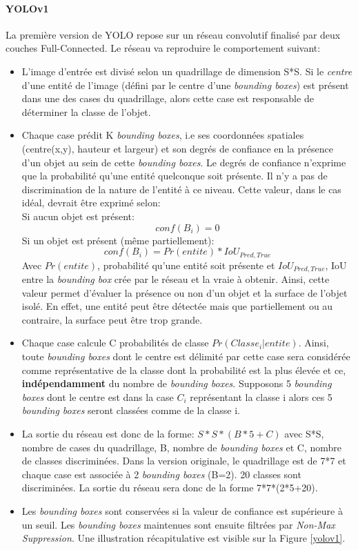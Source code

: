\paragraph{YOLOv1}
La première version de YOLO\cite{yolo_deep} repose sur un réseau convolutif finalisé par deux couches Full-Connected. Le réseau va reproduire le comportement suivant:
\begin{itemize}
    \item L'image d'entrée est divisé selon un quadrillage de dimension S*S. Si le \textit{centre} d'une entité de l'image (défini par le centre d'une \textit{bounding boxes}) est présent dans une des cases du quadrillage, alors cette case est responsable de déterminer la classe de l'objet.

    \item Chaque case prédit K \textit{bounding boxes}, i.e ses coordonnées spatiales (centre(x,y), hauteur et largeur) et son degrés de confiance en la présence d'un objet au sein de cette \textit{bounding boxes}. Le degrés de confiance n'exprime que la probabilité qu'une entité quelconque soit présente. Il n'y a pas de discrimination de la nature de l'entité à ce niveau. Cette valeur, dans le cas idéal, devrait être exprimé selon:\\

    Si aucun objet est présent:
    $$conf(B_i)=0$$
    Si un objet est présent (même partiellement):
    $$conf(B_i)=Pr(entite)*IoU_{Pred,True}$$
    Avec $Pr(entite)$, probabilité qu'une entité soit présente et $IoU_{Pred,True}$, IoU entre la \textit{bounding box} crée par le réseau et la vraie à obtenir. Ainsi, cette valeur permet d'évaluer la présence ou non d'un objet et la surface de l'objet isolé. En effet, une entité peut être détectée mais que partiellement ou au contraire, la surface peut être trop grande.

    \item Chaque case calcule C probabilités de classe $Pr(Classe_i|entite)$. Ainsi, toute \textit{bounding boxes} dont le centre est délimité par cette case sera considérée comme représentative de la classe dont la probabilité est la plus élevée et ce, \textbf{indépendamment} du nombre de \textit{bounding boxes}. Supposons 5 \textit{bounding boxes} dont le centre est dans la case $C_i$ représentant la classe i alors ces 5 \textit{bounding boxes} seront classées comme de la classe i.

    \item La sortie du réseau est donc de la forme: $S*S*(B*5+C)$ avec S*S, nombre de cases du quadrillage, B, nombre de \textit{bounding boxes} et C, nombre de classes discriminées. Dans la version originale, le quadrillage est de 7*7 et chaque case est associée à 2 \textit{bounding boxes} (B=2). 20 classes sont discriminées. La sortie du réseau sera donc de la forme 7*7*(2*5+20).

    \item Les \textit{bounding boxes} sont conservées si la valeur de confiance est supérieure à un seuil. Les \textit{bounding boxes} maintenues sont ensuite filtrées par \textit{Non-Max Suppression}. Une illustration récapitulative est visible sur la Figure \ref{yolov1}.
\end{itemize}

